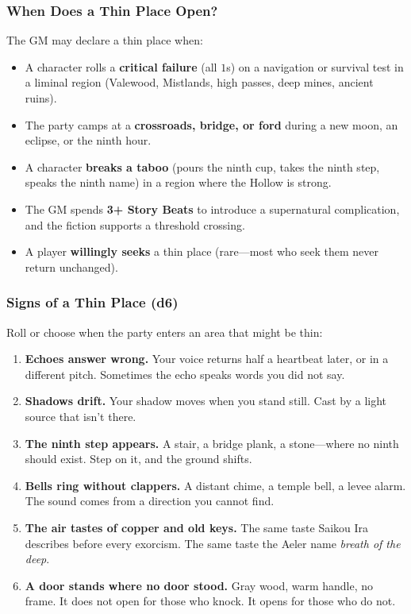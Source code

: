 \subsubsection*{When Does a Thin Place Open?}
The GM may declare a thin place when:
\begin{itemize}
\item A character rolls a \textbf{critical failure} (all $1$s) on a navigation or survival test in a liminal region (Valewood, Mistlands, high passes, deep mines, ancient ruins).
\item The party camps at a \textbf{crossroads, bridge, or ford} during a new moon, an eclipse, or the ninth hour.
\item A character \textbf{breaks a taboo} (pours the ninth cup, takes the ninth step, speaks the ninth name) in a region where the Hollow is strong.
\item The GM spends \textbf{3+ Story Beats} to introduce a supernatural complication, and the fiction supports a threshold crossing.
\item A player \textbf{willingly seeks} a thin place (rare---most who seek them never return unchanged).
\end{itemize}

\subsubsection*{Signs of a Thin Place (d6)}
Roll or choose when the party enters an area that might be thin:
\begin{enumerate}
\item \textbf{Echoes answer wrong.} Your voice returns half a heartbeat later, or in a different pitch. Sometimes the echo speaks words you did not say.
\item \textbf{Shadows drift.} Your shadow moves when you stand still. Cast by a light source that isn't there.
\item \textbf{The ninth step appears.} A stair, a bridge plank, a stone---where no ninth should exist. Step on it, and the ground shifts.
\item \textbf{Bells ring without clappers.} A distant chime, a temple bell, a levee alarm. The sound comes from a direction you cannot find.
\item \textbf{The air tastes of copper and old keys.} The same taste Saikou Ira describes before every exorcism. The same taste the Aeler name \emph{breath of the deep}.
\item \textbf{A door stands where no door stood.} Gray wood, warm handle, no frame. It does not open for those who knock. It opens for those who do not.
\end{enumerate}


